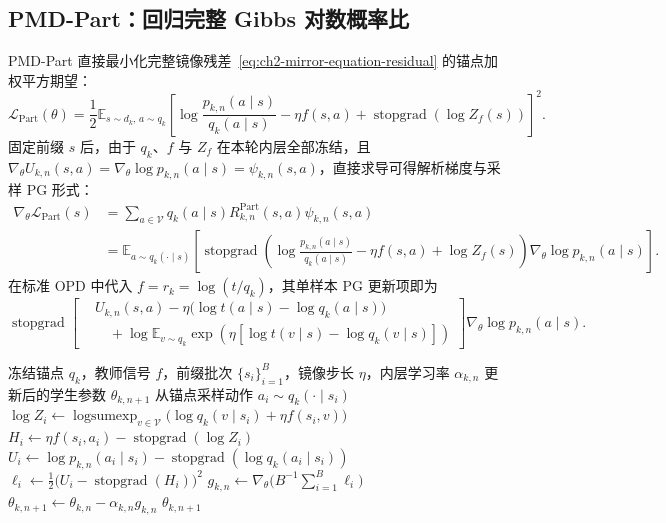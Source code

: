 \documentclass[lang=cn,scheme=chinese,openany]{elegantbook}
\newcommand{\sg}{\operatorname{stopgrad}}
\begin{document}
\subsection{PMD-Part：回归完整 Gibbs 对数概率比}
\label{subsec:ch2-pmd-loss-derivation}
\label{sec:ch2-pmd-part}

PMD-Part 直接最小化完整镜像残差~\eqref{eq:ch2-mirror-equation-residual} 的锚点加权平方期望：
\begin{equation}
\label{eq:ch2-regression-from-mirror,eq:ch2-part-loss}
\mathcal L_{\mathrm{Part}}(\theta)
=\frac12\mathbb E_{s\sim d_k,\,a\sim q_k}
\left[
\log\frac{ p_{k,n}(a\mid s)}{ q_k(a\mid s)}
-\eta f(s,a)+\sg\!\left(\log Z_f(s)\right)
\right]^2.
\end{equation}
固定前缀 $s$ 后，由于 $q_k$、$f$ 与 $Z_f$ 在本轮内层全部冻结，且 $\nabla_\theta U_{k,n}(s,a)=\nabla_\theta\log p_{k,n}(a\mid s)=\psi_{k,n}(s,a)$，直接求导可得解析梯度与采样 PG 形式：
\begin{align}
\nabla_\theta\mathcal L_{\mathrm{Part}}(s)
&=\sum_{a\in\mathcal V} q_k(a\mid s)R_{k,n}^{\mathrm{Part}}(s,a)\psi_{k,n}(s,a)\nonumber\\
&=\mathbb E_{a\sim q_k(\cdot\mid s)}\left[
\sg\!\left(
\log\frac{ p_{k,n}(a\mid s)}{ q_k(a\mid s)}
-\eta f(s,a)+\log Z_f(s)
\right)\nabla_\theta\log p_{k,n}(a\mid s)\right].
\label{eq:ch2-part-gradient-bridge,eq:ch2-part-gradient,eq:ch2-part-pg}
\end{align}
在标准 OPD 中代入 $f=r_k=\log(t/q_k)$，其单样本 PG 更新项即为
\begin{equation}
\label{eq:ch2-part-opd-pg}
\sg\!\left[
\begin{aligned}
&U_{k,n}(s,a)-\eta\bigl(\log t(a\mid s)-\log q_k(a\mid s)\bigr)\\
&\quad+\log\mathbb E_{v\sim q_k}\exp\!\left(\eta[\log t(v\mid s)-\log q_k(v\mid s)]\right)
\end{aligned}
\right]\nabla_\theta\log p_{k,n}(a\mid s).
\end{equation}

\begin{algorithm}[ht]
\caption{PMD-Part 内层更新\\{\small\textit{数学语义：固定锚点测度下的完整 Gibbs 对数概率比平方回归}}}
\begin{algorithmic}[1]
\Require 冻结锚点 $q_k$，教师信号 $f$，前缀批次 $\{s_i\}_{i=1}^B$，镜像步长 $\eta$，内层学习率 $\alpha_{k,n}$
\Ensure 更新后的学生参数 $\theta_{k,n+1}$
    \State 从锚点采样动作 $a_i\sim q_k(\cdot\mid s_i)$
    \State $\log Z_i\gets\operatorname{logsumexp}_{v\in\mathcal V}\bigl(\log q_k(v\mid s_i)+\eta f(s_i,v)\bigr)$
    \State $H_i\gets\eta f(s_i,a_i)-\sg(\log Z_i)$
    \State $U_i\gets\log p_{k,n}(a_i\mid s_i)-\sg(\log q_k(a_i\mid s_i))$
    \State $\ell_i\gets\frac12\bigl(U_i-\sg(H_i)\bigr)^2$
\EndFor
\State $g_{k,n}\gets\nabla_\theta\bigl(B^{-1}\sum_{i=1}^B\ell_i\bigr)$
\State $\theta_{k,n+1}\gets\theta_{k,n}-\alpha_{k,n}g_{k,n}$
\State \Return $\theta_{k,n+1}$
\end{algorithmic}
\end{algorithm}
\end{document}
